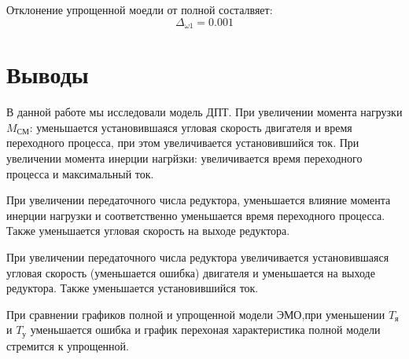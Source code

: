 \documentclass[a4paper, 12pt]{article}
\begin{document}
	Отклонение упрощенной моедли от полной состалвяет:
	\begin{equation}
	\Delta_{\omega1} = 0.001
	\end{equation}
	
	\newpage
	\section*{\centering Выводы}
	В данной работе мы исследовали модель ДПТ. При увеличении момента нагрузки $M_\text{СМ}$: уменьшается установившаяся угловая скорость двигателя и время переходного процесса, при этом увеличивается установившийся ток. При увеличении момента инерции нагрйзки: увеличивается время переходного процесса и максимальный ток. \par
	При увеличении передаточного числа редуктора, уменьшается влияние момента инерции нагрузки и соответственно уменьшается время переходного процесса. Также уменьшается угловая скорость на выходе редуктора. \par
	При увеличении передаточного числа редуктора увеличивается установившаяся угловая скорость (уменьшается ошибка) двигателя и уменьшается на выходе редуктора. Также уменьшается установившийся ток. \par
	При сравнении графиков полной и упрощенной модели ЭМО,при уменьшении $T_\text{я}$ и $T_\text{у}$ уменьшается ошибка и график перехоная характеристика полной модели стремится к упрощенной. \par
\end{document}
